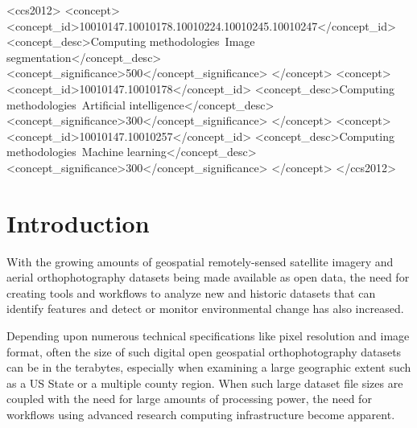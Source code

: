 \documentclass[acmtog, authorversion]{acmart}
\begin{document}

\begin{CCSXML}
<ccs2012>
<concept>
<concept_id>10010147.10010178.10010224.10010245.10010247</concept_id>
<concept_desc>Computing methodologies~Image segmentation</concept_desc>
<concept_significance>500</concept_significance>
</concept>
<concept>
<concept_id>10010147.10010178</concept_id>
<concept_desc>Computing methodologies~Artificial intelligence</concept_desc>
<concept_significance>300</concept_significance>
</concept>
<concept>
<concept_id>10010147.10010257</concept_id>
<concept_desc>Computing methodologies~Machine learning</concept_desc>
<concept_significance>300</concept_significance>
</concept>
</ccs2012>
\end{CCSXML}




\maketitle

\section{Introduction}

With the growing amounts of geospatial remotely-sensed satellite imagery and aerial orthophotography datasets being made available as open data, the need for creating tools and workflows to analyze new and historic datasets that can identify features and detect or monitor environmental change has also increased.

Depending upon numerous technical specifications like pixel resolution and image format, often the size of such digital open geospatial orthophotography datasets can be in the terabytes, especially when examining a large geographic extent such as a US State or a multiple county region.  When such large dataset file sizes are coupled with the need for large amounts of processing power, the need for workflows using advanced research computing infrastructure become apparent.
\end{document}
